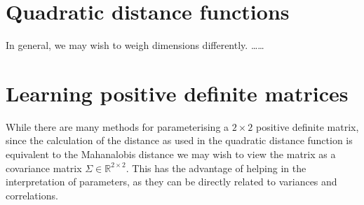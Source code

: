 \documentclass[a4paper, 12pt]{report}
\def\comment#1{\color{red}#1\color{black}}
\begin{document}
\section{Quadratic distance functions}
In general, we may wish to weigh dimensions differently. \comment{\ldots\ldots}


\section{Learning positive definite matrices}
While there are many methods for parameterising a $2\times2$ positive definite matrix, since the calculation of the distance as used in the quadratic distance function is equivalent to the Mahanalobis distance we may wish to view the matrix as a covariance matrix $\Sigma \in \mathbb{R}^{2\times2}$. This has the advantage of helping in the interpretation of parameters, as they can be directly related to variances and correlations.
\end{document}
